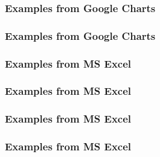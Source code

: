 \documentclass[12pt]{beamer}\usepackage[]{graphicx}\usepackage[]{color}
\begin{document}

\begin{frame}
\frametitle{Examples from Google Charts}
\begin{center}
\end{center}
\end{frame}


\begin{frame}
\frametitle{Examples from Google Charts}
\begin{center}
\end{center}
\end{frame}


\begin{frame}
\frametitle{Examples from MS Excel}
\begin{center}
\end{center}
\end{frame}


\begin{frame}
\frametitle{Examples from MS Excel}
\begin{center}
\end{center}
\end{frame}


\begin{frame}
\frametitle{Examples from MS Excel}
\begin{center}
\end{center}
\end{frame}


\begin{frame}
\frametitle{Examples from MS Excel}
\begin{center}
\end{center}
\end{frame}

\end{document}
